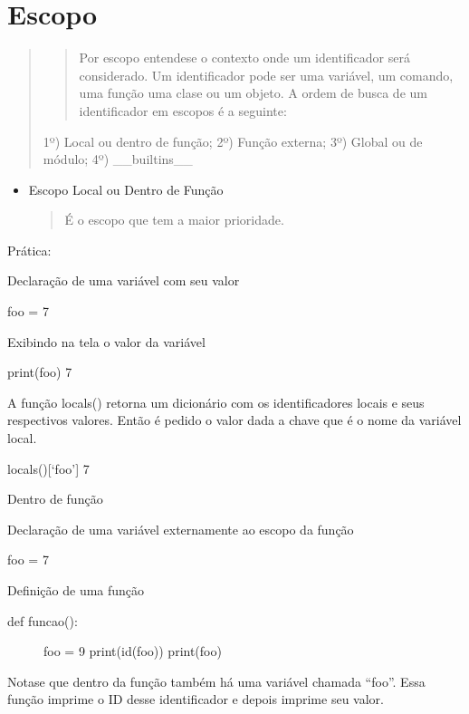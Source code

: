 \documentclass[letterpaper,10pt,brazil]{sphinxmanual}
\begin{document}
\chapter{Escopo}
\label{\detokenize{content/scope:escopo}}\label{\detokenize{content/scope::doc}}\begin{quote}
\begin{quote}

Por escopo entende\sphinxhyphen{}se o contexto onde um identificador será considerado.
Um identificador pode ser uma variável, um comando, uma função uma clase ou um objeto.
A ordem de busca de um identificador em escopos é a seguinte:
\end{quote}

1º) Local ou dentro de função;
2º) Função externa;
3º) Global ou de módulo;
4º) \_\_builtins\_\_
\end{quote}
\begin{itemize}
\item {} 
Escopo Local ou Dentro de Função
\begin{quote}

É o escopo que tem a maior prioridade.
\end{quote}

\end{itemize}

Prática:

Declaração de uma variável com seu valor

foo = 7

Exibindo na tela o valor da variável

print(foo)
7

A função locals() retorna um dicionário com os identificadores locais e seus respectivos valores.
Então é pedido o valor dada a chave que é o nome da variável local.

locals(){[}‘foo’{]}
7

Dentro de função

Declaração de uma variável externamente ao escopo da função

foo = 7

Definição de uma função
\begin{description}
\item[{def funcao():}] \leavevmode
foo = 9
print(id(foo))
print(foo)

\end{description}

Nota\sphinxhyphen{}se que dentro da função também há uma variável chamada “foo”.
Essa função imprime o ID desse identificador e depois imprime seu valor.
\end{document}
